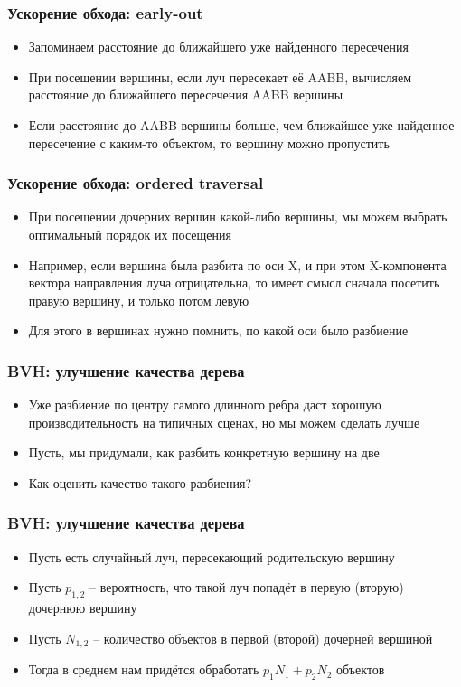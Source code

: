 \documentclass[10pt]{beamer}
\begin{document}
\begin{frame}[fragile]
\frametitle{Ускорение обхода: early-out}
\begin{itemize}
\item Запоминаем расстояние до ближайшего уже найденного пересечения
\pause
\item При посещении вершины, если луч пересекает её AABB, вычисляем расстояние до ближайшего пересечения AABB вершины
\pause
\item Если расстояние до AABB вершины больше, чем ближайшее уже найденное пересечение с каким-то объектом, то вершину можно пропустить
\end{itemize}
\end{frame}

\begin{frame}[fragile]
\frametitle{Ускорение обхода: ordered traversal}
\begin{itemize}
\item При посещении дочерних вершин какой-либо вершины, мы можем выбрать оптимальный порядок их посещения
\pause
\item Например, если вершина была разбита по оси X, и при этом X-компонента вектора направления луча отрицательна, то имеет смысл сначала посетить правую вершину, и только потом левую
\pause
\item Для этого в вершинах нужно помнить, по какой оси было разбиение
\end{itemize}
\end{frame}

\begin{frame}[fragile]
\frametitle{BVH: улучшение качества дерева}
\begin{itemize}
\item Уже разбиение по центру самого длинного ребра даст хорошую производительность на типичных сценах, но мы можем сделать лучше
\pause
\item Пусть, мы придумали, как разбить конкретную вершину на две
\pause
\item Как оценить качество такого разбиения?
\end{itemize}
\end{frame}

\begin{frame}[fragile]
\frametitle{BVH: улучшение качества дерева}
\begin{itemize}
\item Пусть есть случайный луч, пересекающий родительскую вершину
\pause
\item Пусть \begin{math}p_{1,2}\end{math} -- вероятность, что такой луч попадёт в первую (вторую) дочернюю вершину
\pause
\item Пусть \begin{math}N_{1,2}\end{math} -- количество объектов в первой (второй) дочерней вершиной
\pause
\item Тогда в среднем нам придётся обработать \begin{math}p_1N_1+p_2N_2\end{math} объектов
\end{itemize}
\end{frame}
\end{document}
